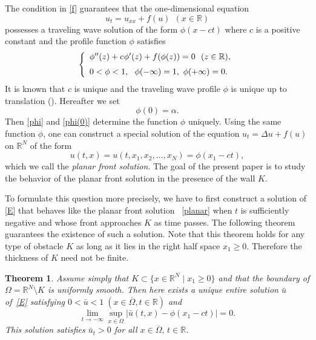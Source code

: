 \documentclass[a4paper,12pt,fullpage]{article}
\numberwithin{equation}{section}
\newtheorem{Thm}{Theorem}
\def\R{{\mathbb R}}
\begin{document}
The condition in \eqref{f} guarantees that the one-dimensional equation
\[
u_t=u_{xx}+f(u) \ \ (x\in\R)
\]
possesses a traveling wave solution of the form $\phi(x-ct)$ where $c$ is a positive constant and the profile function $\phi$ satisfies
\begin{equation}\label{phi}
\left\{
\begin{array}{l}
\phi''(z)+c\hspace{0.5pt}\phi'(z)+f(\phi(z))=0\ \ (z\in\R),\\[6pt]
0<\phi<1,\ \ \phi(-\infty)=1,\ \phi(+\infty)=0.
\end{array}\right.
\end{equation}
It is known that $c$ is unique and the traveling wave profile $\phi$ is unique up to translation (\cite{FM}). Hereafter we set
\begin{equation}\label{phi(0)}
\phi(0)=\alpha.
\end{equation}
Then \eqref{phi} and \eqref{phi(0)} determine the function $\phi$ uniquely. Using the same function $\phi$, one can construct a special solution of the equation $u_t=\Delta u+f(u)$ on $\R^N$ of the form
\begin{equation}\label{planar}
u(t,x)=u(t,x_1,x_2,\ldots,x_N)=\phi(x_1-ct),
\end{equation}
which we call the {\it planar front solution}. The goal of the present paper is to study the behavior of the planar front solution in the presence of the wall $K$. 

To formulate this question more precisely, we have to first construct a solution of \eqref{E} that behaves like the planar front solution ~\eqref{planar} when $t$ is sufficiently negative and whose front approaches $K$ as time passes. The following theorem guarantees the existence of such a solution. Note that this theorem holds for any type of obstacle $K$ as long as it lies in the right half space $x_1\geq 0$. Therefore the thickness of $K$ need not be finite.

\begin{Thm}\label{th:ubar-phi}
Assume simply that $K\subset \{x\in\R^N\mid x_1\geq 0\}$ and that the boundary of $\Omega=\R^N\setminus K$ is uniformly smooth. Then here exists a unique entire solution $\bar u$ of~\eqref{E} satisfying $0<\bar u<1 \;(x\in\overline{\Omega}, t\in\R)$ and 
\begin{equation}\label{ubar-phi}
\lim_{t\to-\infty}\sup_{x\in\Omega} |\bar u(t,x)-\phi(x_1-ct)|=0. 
\end{equation}
This solution satisfies $\bar u_t>0$ for all $x\in\overline{\Omega}, \,t\in\R$.
\end{Thm}
\end{document}
